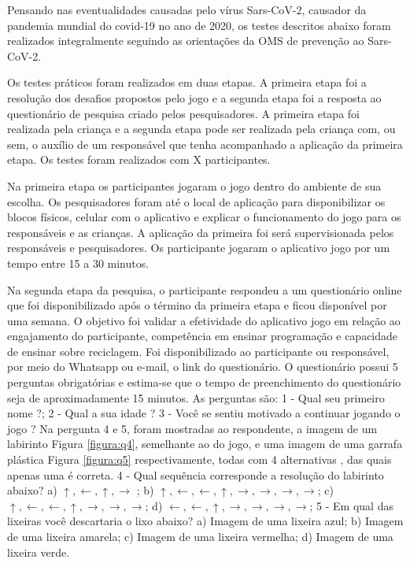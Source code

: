 Pensando nas eventualidades causadas pelo vírus Sars-CoV-2, causador da pandemia mundial do covid-19 no ano de 2020, os testes descritos abaixo foram realizados integralmente seguindo as orientações da OMS \cite{oms_2020} de prevenção ao Sars-CoV-2.

Os testes práticos foram realizados em duas etapas. A primeira etapa foi a resolução dos desafios propostos pelo jogo e a segunda etapa foi a resposta ao questionário de pesquisa criado pelos pesquisadores. A primeira etapa foi realizada pela criança e a segunda etapa pode ser realizada pela criança com, ou sem, o auxílio de um responsável que tenha acompanhado a aplicação da primeira etapa. Os testes foram realizados com X participantes.

Na primeira etapa os participantes jogaram o jogo dentro do ambiente de sua escolha. Os pesquisadores foram até o local de aplicação para disponibilizar os blocos físicos, celular com o aplicativo e explicar o
funcionamento do jogo para os responsáveis e as crianças. A aplicação da primeira foi será supervisionada pelos responsáveis e pesquisadores. Os participante jogaram o  aplicativo jogo por um tempo entre 15 a 30 minutos.

Na segunda etapa da pesquisa, o participante respondeu  a um questionário online que foi disponibilizado após o término da primeira etapa e ficou disponível por uma semana. O objetivo foi  validar a efetividade do aplicativo jogo em relação ao engajamento do participante, competência em ensinar programação e
capacidade de ensinar sobre reciclagem. Foi disponibilizado ao participante ou responsável, por meio do Whatsapp ou e-mail, o link do questionário. O questionário possui 5 perguntas obrigatórias e estima-se que o tempo de preenchimento do questionário seja de aproximadamente 15 minutos. As perguntas são: 1 - Qual seu primeiro nome ?; 2 - Qual a sua idade ? 3 - Você se sentiu motivado a continuar jogando o jogo ? Na pergunta 4 e 5, foram mostradas ao respondente, a imagem de um labirinto Figura \ref{figura:q4}, semelhante ao do jogo, e uma imagem de uma garrafa plástica Figura \ref{figura:q5} respectivamente, todas com 4 alternativas , das quais apenas uma é correta. 4 - Qual sequência corresponde a resolução do labirinto abaixo? a) $\uparrow,  \leftarrow, \uparrow, \rightarrow$ ; b) $\uparrow, \leftarrow, \leftarrow, \uparrow, \rightarrow, \rightarrow, \rightarrow, \rightarrow$; c) $\uparrow, \leftarrow, \leftarrow, \uparrow, \rightarrow, \rightarrow, \rightarrow$; d) $\leftarrow, \leftarrow, \uparrow, \rightarrow, \rightarrow, \rightarrow, \rightarrow$; 5 - Em qual das lixeiras você descartaria o lixo abaixo? a) Imagem de uma lixeira azul; b) Imagem de uma lixeira amarela; c) Imagem de uma lixeira vermelha; d) Imagem de uma lixeira verde.

